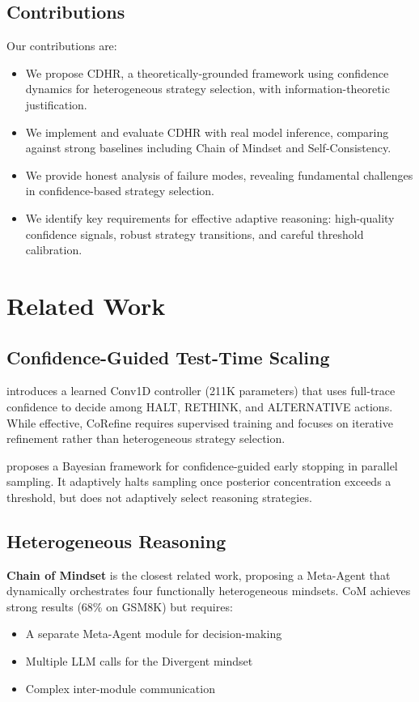 \documentclass{article}
\begin{document}
\subsection{Contributions}

Our contributions are:
\begin{itemize}
    \item We propose CDHR, a theoretically-grounded framework using confidence dynamics for heterogeneous strategy selection, with information-theoretic justification.
    \item We implement and evaluate CDHR with real model inference, comparing against strong baselines including Chain of Mindset and Self-Consistency.
    \item We provide honest analysis of failure modes, revealing fundamental challenges in confidence-based strategy selection.
    \item We identify key requirements for effective adaptive reasoning: high-quality confidence signals, robust strategy transitions, and careful threshold calibration.
\end{itemize}

\section{Related Work}

\subsection{Confidence-Guided Test-Time Scaling}

\citet{jin2024corefine} introduces a learned Conv1D controller (211K parameters) that uses full-trace confidence to decide among HALT, RETHINK, and ALTERNATIVE actions. While effective, CoRefine requires supervised training and focuses on iterative refinement rather than heterogeneous strategy selection.

\citet{mohtashami2025confidence} proposes a Bayesian framework for confidence-guided early stopping in parallel sampling. It adaptively halts sampling once posterior concentration exceeds a threshold, but does not adaptively select reasoning strategies.

\subsection{Heterogeneous Reasoning}

\textbf{Chain of Mindset} \citep{jiang2024chain} is the closest related work, proposing a Meta-Agent that dynamically orchestrates four functionally heterogeneous mindsets. CoM achieves strong results (68\% on GSM8K) but requires:
\begin{itemize}
    \item A separate Meta-Agent module for decision-making
    \item Multiple LLM calls for the Divergent mindset
    \item Complex inter-module communication
\end{itemize}
\end{document}
